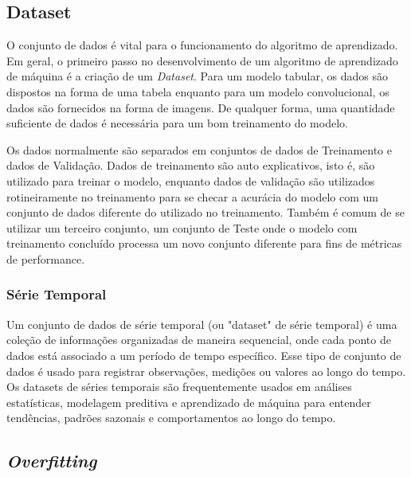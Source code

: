 \subsection{\textbf{Dataset}}
\label{dataset}

O conjunto de dados é vital para o funcionamento do algoritmo de aprendizado. Em geral, o primeiro passo no desenvolvimento de um algoritmo de aprendizado de máquina é a criação de um \textit{Dataset}. Para um modelo tabular, os dados são dispostos na forma de uma tabela enquanto para um modelo convolucional, os dados são fornecidos na forma de imagens. De qualquer forma, uma quantidade suficiente de dados é necessária para um bom treinamento do modelo.

Os dados normalmente são separados em conjuntos de dados de Treinamento e dados de Validação. Dados de treinamento são auto explicativos, isto é, são utilizado para treinar o modelo, enquanto dados de validação são utilizados rotineiramente no treinamento para se checar a acurácia do modelo com um conjunto de dados diferente do utilizado no treinamento. Também é comum de se utilizar um terceiro conjunto, um conjunto de Teste onde o modelo com treinamento concluído processa um novo conjunto diferente para fins de métricas de performance.


\subsubsection{\textbf{Série Temporal}}
Um conjunto de dados de série temporal (ou "dataset" de série temporal) é uma coleção de informações organizadas de maneira sequencial, onde cada ponto de dados está associado a um período de tempo específico. Esse tipo de conjunto de dados é usado para registrar observações, medições ou valores ao longo do tempo. 
Os datasets de séries temporais são frequentemente usados em análises estatísticas, modelagem preditiva e aprendizado de máquina para entender tendências, padrões sazonais e comportamentos ao longo do tempo.

\subsection{\textbf{\textit{Overfitting}}}

